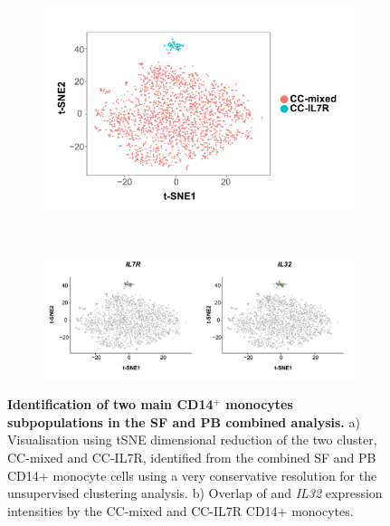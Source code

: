 \bigskip
\begin{figure}[H]
\centering
\begin{subfigure}[b]{0.60\textwidth}
\centering 
\includegraphics[width=\textwidth]{./Results3/pdfs/PSA_scRNAseq_tSNE_CC_mixed_and_IL7R}
\caption{}
\end{subfigure}
~
\begin{subfigure}[b]{0.75\textwidth} 
\centering
\includegraphics[width=\textwidth]{./Results3/pdfs/PSA_scRNAseq_CC_mixed_and_IL7R_overlay_markers}
\caption{}
\end{subfigure}
\caption[Identification of two main CD14$^+$ monocytes subpopulations in the SF and PB combined analysis]{\textbf{Identification of two main CD14$^+$ monocytes subpopulations in the SF and PB combined analysis.} a) Visualisation using tSNE dimensional reduction of the two cluster, CC-mixed and CC-IL7R, identified from the combined SF and PB CD14$+$ monocyte cells using a very conservative resolution for the unsupervised clustering analysis. b) Overlap of  and \textit{IL32} expression intensities by the CC-mixed and CC-IL7R CD14$+$ monocytes.}
\label{figure:PsA_scRNAseq_SF_an_PB_monocytes_identification_from_bulk}
\end{figure}


